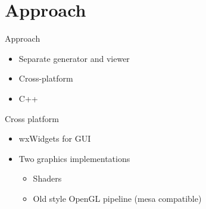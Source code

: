 \documentclass[english,aspectratio=43]{beamer}
\begin{document}
	\section{Approach}
	\begin{frame}{Approach}
		\begin{itemize}
			\item Separate generator and viewer
			\item Cross-platform
			\item C++
		\end{itemize}
	\end{frame}

	\begin{frame}{Cross platform}
		\begin{itemize}
			\item<1,4-> wxWidgets for GUI
			\item<1-> Two graphics implementations
				\begin{itemize}
					\item Shaders
					\item Old style OpenGL pipeline (mesa compatible)
				\end{itemize}
		\end{itemize}
	\end{frame}
\end{document}
